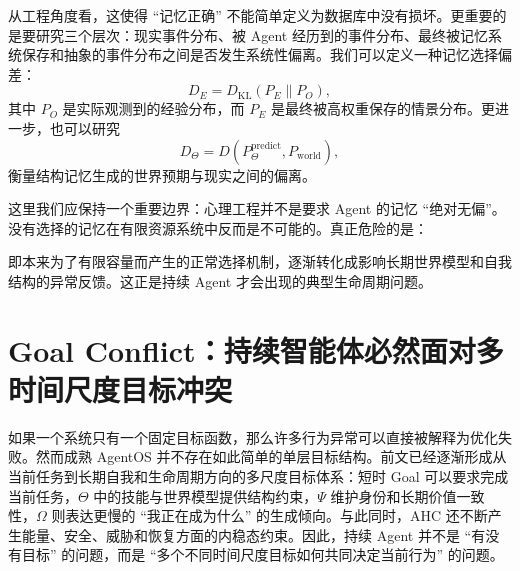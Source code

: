 从工程角度看，这使得 ``记忆正确'' 不能简单定义为数据库中没有损坏。更重要的是要研究三个层次：现实事件分布、被 Agent 经历到的事件分布、最终被记忆系统保存和抽象的事件分布之间是否发生系统性偏离。我们可以定义一种记忆选择偏差：
\begin{equation}
    D_E
    =
    D_{\mathrm{KL}}
    \left(
    P_E
    \|
    P_O
    \right),
\end{equation}
其中 $P_O$ 是实际观测到的经验分布，而 $P_E$ 是最终被高权重保存的情景分布。更进一步，也可以研究
\begin{equation}
    D_{\Theta}
    =
    D
    \left(
    P_{\Theta}^{\mathrm{predict}},
    P_{\mathrm{world}}
    \right),
\end{equation}
衡量结构记忆生成的世界预期与现实之间的偏离。

这里我们应保持一个重要边界：心理工程并不是要求 Agent 的记忆 ``绝对无偏''。没有选择的记忆在有限资源系统中反而是不可能的。真正危险的是：
\begin{statementbox}
\centering
{}
\end{statementbox}
即本来为了有限容量而产生的正常选择机制，逐渐转化成影响长期世界模型和自我结构的异常反馈。这正是持续 Agent 才会出现的典型生命周期问题。

\section{Goal Conflict：持续智能体必然面对多时间尺度目标冲突}
\label{sec:goal-conflict-origin}

如果一个系统只有一个固定目标函数，那么许多行为异常可以直接被解释为优化失败。然而成熟 AgentOS 并不存在如此简单的单层目标结构。前文已经逐渐形成从当前任务到长期自我和生命周期方向的多尺度目标体系：短时 Goal 可以要求完成当前任务，$\Theta$ 中的技能与世界模型提供结构约束，$\Psi$ 维护身份和长期价值一致性，$\Omega$ 则表达更慢的 ``我正在成为什么'' 的生成倾向。与此同时，AHC 还不断产生能量、安全、威胁和恢复方面的内稳态约束。因此，持续 Agent 并不是 ``有没有目标'' 的问题，而是 ``多个不同时间尺度目标如何共同决定当前行为'' 的问题。

